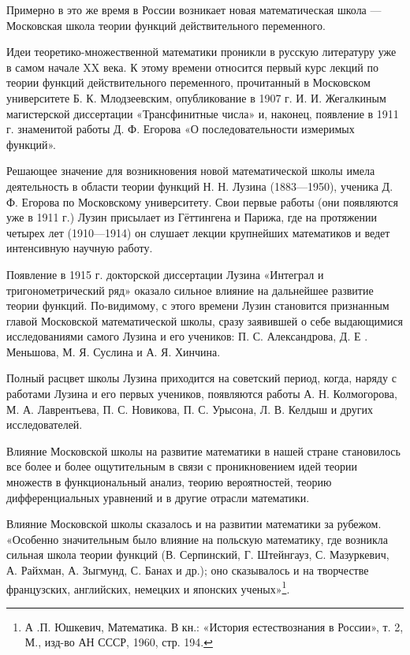 \documentclass[12pt, a4paper, openany]{book}
\begin{document}
Примерно в это же время в России возникает новая математическая школа — Московская школа теории функций действительного переменного.

Идеи теоретико-множественной математики проникли в русскую литературу уже в самом начале XX века. К этому времени относится первый курс лекций по теории функций действительного переменного, прочитанный в Московском университете Б. К. Млодзеевским, опубликование в 1907 г. И. И. Жегалкиным магистерской диссертации «Трансфинитные числа» и, наконец, появление в 1911 г. знаменитой работы Д. Ф. Егорова «О последовательности измеримых функций».

Решающее значение для возникновения новой математической школы имела деятельность в области теории функций Н. Н. Лузина (1883—1950), ученика Д. Ф. Егорова по Московскому университету. Свои первые работы (они появляются уже в 1911 г.) Лузин присылает из Гёттингена и Парижа, где на протяжении четырех лет (1910—1914) он слушает лекции крупнейших математиков и ведет интенсивную научную работу.

Появление в 1915 г. докторской диссертации Лузина «Интеграл и тригонометрический ряд» оказало сильное влияние на дальнейшее развитие теории функций. По-видимому, с этого времени Лузин становится признанным главой Московской математической школы, сразу заявившей о себе выдающимися исследованиями самого Лузина и его учеников: П. С. Александрова, Д. Е . Меньшова, М. Я. Суслина и А. Я. Хинчина.

Полный расцвет школы Лузина приходится на советский период, когда, наряду с работами Лузина и его первых учеников, появляются работы А. Н. Колмогорова, М. А. Лаврентьева, П. С. Новикова, П. С. Урысона, Л. В. Келдыш и других исследователей.

Влияние Московской школы на развитие математики в нашей стране становилось все более и более ощутительным в связи с проникновением идей теории множеств в функциональный анализ, теорию вероятностей, теорию дифференциальных уравнений и в другие отрасли математики.

Влияние Московской школы сказалось и на развитии математики за рубежом. «Особенно значительным было влияние на польскую математику, где возникла сильная школа теории функций (В. Серпинский, Г. Штейнгауз, С. Мазуркевич, А. Райхман, А. Зыгмунд, С. Банах и др.); оно сказывалось и на творчестве французских, английских, немецких и японских ученых»{\footnote{А .П. Юшкевич, Математика. В кн.: «История естествознания в России», т. 2, М., изд-во АН СССР, 1960, стр. 194.}}.
\end{document}
